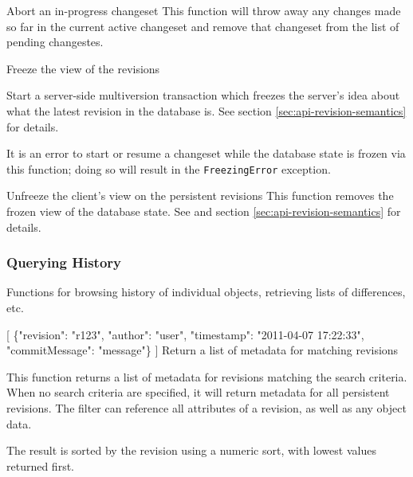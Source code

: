 \documentclass{article}
\begin{document}
    {Abort an in-progress changeset}
    {This function will throw away any changes made so far in the current active changeset and remove that changeset
    from the list of pending changestes.}

    {Freeze the view of the revisions}
    {Start a server-side multiversion transaction which freezes the server's idea about what the latest revision in the
    database is. See section \ref{sec:api-revision-semantics} for details.

    It is an error to start or resume a changeset while the database state is frozen via this function; doing so will
    result in the {\tt FreezingError} exception.}

    {Unfreeze the client's view on the persistent revisions}
    {This function removes the frozen view of the database state.  See  and section
    \ref{sec:api-revision-semantics} for details.}

\subsubsection{Querying History}
\label{sec:api-group-history}

Functions for browsing history of individual objects, retrieving lists of differences, etc.

    {[
    \{"revision": "r123", "author": "user", "timestamp": "2011-04-07 17:22:33", "commitMessage": "message"\}
    ]}
    {Return a list of metadata for matching revisions}
    {This function returns a list of metadata for revisions matching the search criteria.  When no search criteria are
    specified, it will return metadata for all persistent revisions.  The filter can reference all attributes of a
    revision, as well as any object data.

    The result is sorted by the revision using a numeric sort, with lowest values returned first.}
\end{document}
